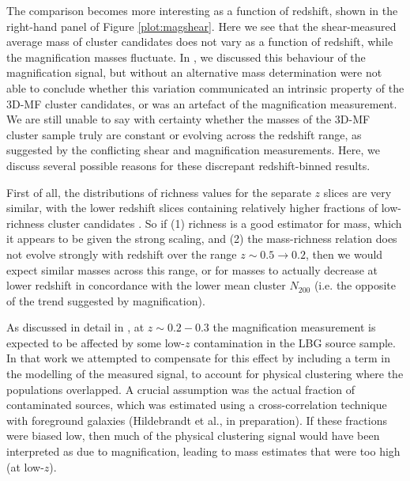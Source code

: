 The comparison becomes more interesting as a function of redshift, shown in the right-hand panel of Figure \ref{plot:magshear}. Here we see that the shear-measured average mass of cluster candidates does not vary as a function of redshift, while the magnification masses fluctuate. In \citet{Ford14}, we discussed this behaviour of the magnification signal, but without an alternative mass determination were not able to conclude whether this variation communicated an intrinsic property of the \ac{3D-MF} cluster candidates, or was an artefact of the magnification measurement. We are still unable to say with certainty whether the masses of the \ac{3D-MF} cluster sample truly are constant or evolving across the redshift range, as suggested by the conflicting shear and magnification measurements. Here, we discuss several possible reasons for these discrepant redshift-binned results. 

First of all, the distributions of richness values for the separate $z$ slices are very similar, with the lower redshift slices containing relatively higher fractions of low-richness cluster candidates \citep[see Figure 7 in][]{Ford14}. So if (1) richness is a good estimator for mass, which it appears to be given the strong scaling, and (2) the mass-richness relation does not evolve strongly with redshift over the range $z \sim 0.5 \rightarrow 0.2$, then we would expect similar masses across this range, or for masses to actually decrease at lower redshift in concordance with the lower mean cluster $N_{200}$ (i.e. the opposite of the trend suggested by magnification).

As discussed in detail in \citet{Ford14}, at $z \sim 0.2-0.3$ the magnification measurement is expected to be affected by some low-$z$ contamination in the \ac{LBG} source sample. In that work we attempted to compensate for this effect by including a term in the modelling of the measured signal, to account for physical clustering where the populations overlapped. A crucial assumption was the actual fraction of contaminated sources, which was estimated using a cross-correlation technique with foreground galaxies (Hildebrandt et al., in preparation). If these fractions were biased low, then much of the physical clustering signal would have been interpreted as due to magnification, leading to mass estimates that were too high (at low-$z$).

